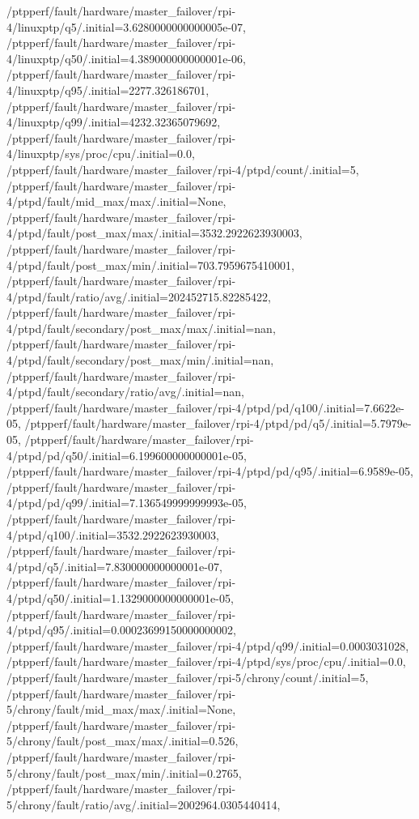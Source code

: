 {    /ptpperf/fault/hardware/master_failover/rpi-4/linuxptp/q5/.initial=3.6280000000000005e-07,
    /ptpperf/fault/hardware/master_failover/rpi-4/linuxptp/q50/.initial=4.389000000000001e-06,
    /ptpperf/fault/hardware/master_failover/rpi-4/linuxptp/q95/.initial=2277.326186701,
    /ptpperf/fault/hardware/master_failover/rpi-4/linuxptp/q99/.initial=4232.32365079692,
    /ptpperf/fault/hardware/master_failover/rpi-4/linuxptp/sys/proc/cpu/.initial=0.0,
    /ptpperf/fault/hardware/master_failover/rpi-4/ptpd/count/.initial=5,
    /ptpperf/fault/hardware/master_failover/rpi-4/ptpd/fault/mid_max/max/.initial=None,
    /ptpperf/fault/hardware/master_failover/rpi-4/ptpd/fault/post_max/max/.initial=3532.2922623930003,
    /ptpperf/fault/hardware/master_failover/rpi-4/ptpd/fault/post_max/min/.initial=703.7959675410001,
    /ptpperf/fault/hardware/master_failover/rpi-4/ptpd/fault/ratio/avg/.initial=202452715.82285422,
    /ptpperf/fault/hardware/master_failover/rpi-4/ptpd/fault/secondary/post_max/max/.initial=nan,
    /ptpperf/fault/hardware/master_failover/rpi-4/ptpd/fault/secondary/post_max/min/.initial=nan,
    /ptpperf/fault/hardware/master_failover/rpi-4/ptpd/fault/secondary/ratio/avg/.initial=nan,
    /ptpperf/fault/hardware/master_failover/rpi-4/ptpd/pd/q100/.initial=7.6622e-05,
    /ptpperf/fault/hardware/master_failover/rpi-4/ptpd/pd/q5/.initial=5.7979e-05,
    /ptpperf/fault/hardware/master_failover/rpi-4/ptpd/pd/q50/.initial=6.199600000000001e-05,
    /ptpperf/fault/hardware/master_failover/rpi-4/ptpd/pd/q95/.initial=6.9589e-05,
    /ptpperf/fault/hardware/master_failover/rpi-4/ptpd/pd/q99/.initial=7.136549999999993e-05,
    /ptpperf/fault/hardware/master_failover/rpi-4/ptpd/q100/.initial=3532.2922623930003,
    /ptpperf/fault/hardware/master_failover/rpi-4/ptpd/q5/.initial=7.830000000000001e-07,
    /ptpperf/fault/hardware/master_failover/rpi-4/ptpd/q50/.initial=1.1329000000000001e-05,
    /ptpperf/fault/hardware/master_failover/rpi-4/ptpd/q95/.initial=0.00023699150000000002,
    /ptpperf/fault/hardware/master_failover/rpi-4/ptpd/q99/.initial=0.0003031028,
    /ptpperf/fault/hardware/master_failover/rpi-4/ptpd/sys/proc/cpu/.initial=0.0,
    /ptpperf/fault/hardware/master_failover/rpi-5/chrony/count/.initial=5,
    /ptpperf/fault/hardware/master_failover/rpi-5/chrony/fault/mid_max/max/.initial=None,
    /ptpperf/fault/hardware/master_failover/rpi-5/chrony/fault/post_max/max/.initial=0.526,
    /ptpperf/fault/hardware/master_failover/rpi-5/chrony/fault/post_max/min/.initial=0.2765,
    /ptpperf/fault/hardware/master_failover/rpi-5/chrony/fault/ratio/avg/.initial=2002964.0305440414,
}

